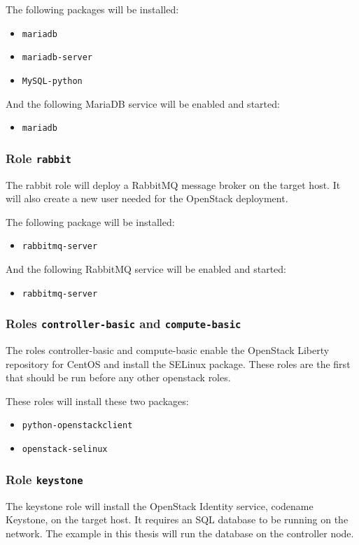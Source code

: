 The following packages will be installed:
\begin{itemize}
\item{\texttt{mariadb}}
\item{\texttt{mariadb-server}}
\item{\texttt{MySQL-python}}
\end{itemize}

And the following MariaDB service will be enabled and started:
\begin{itemize}
\item{\texttt{mariadb}}
\end{itemize}

\subsubsection*{Role \texttt{rabbit}}
The rabbit role will deploy a RabbitMQ message broker on the target host. It will also create a new user needed for the OpenStack deployment.

The following package will be installed:
\begin{itemize}
  \item{\texttt{rabbitmq-server}}
\end{itemize}

And the following RabbitMQ service will be enabled and started:
\begin{itemize}
  \item{\texttt{rabbitmq-server}}
\end{itemize}

\subsubsection*{Roles \texttt{controller-basic} and \texttt{compute-basic}}
The roles controller-basic and compute-basic enable the OpenStack Liberty repository for CentOS and install the SELinux package. These roles are the first that should be run before any other openstack roles.

These roles will install these two packages:
\begin{itemize}
  \item{\texttt{python-openstackclient}}
  \item{\texttt{openstack-selinux}}
\end{itemize}

\subsubsection*{Role \texttt{keystone}}
The keystone role will install the OpenStack Identity service, codename Keystone, on the target host. It requires an SQL database to be running on the network. The example in this thesis will run the database on the controller node.

